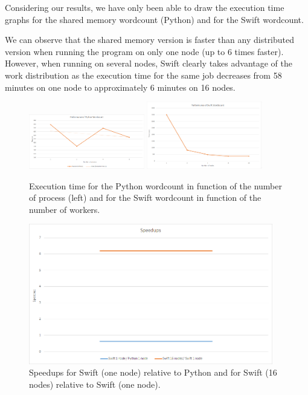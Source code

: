 \documentclass{article}
\begin{document}
Considering our results, we have only been able to draw the execution time graphs for the shared memory wordcount (Python) and for the Swift wordcount.

We can observe that the shared memory version is faster than any distributed version when running the program on only one node (up to 6 times faster). However, when running on several nodes, Swift clearly takes advantage of the work distribution as the execution time for the same job decreases from 58 minutes on one node to approximately 6 minutes on 16 nodes.

\begin{figure}[!ht]
   \centering
   \includegraphics[width=0.45\textwidth]{img/perf-python.png} 
   \includegraphics[width=0.45\textwidth]{img/perf-swift.png}
  \caption{Execution time for the Python wordcount in function of the number of process (left) and for the Swift wordcount in function of the number of workers.}
\end{figure}

\begin{figure}[!ht]
   \centering
   \includegraphics[width=0.95\textwidth]{img/speedup.png} 
  \caption{Speedups for Swift (one node) relative to Python and for Swift (16 nodes) relative to Swift (one node).}
\end{figure}
\end{document}
